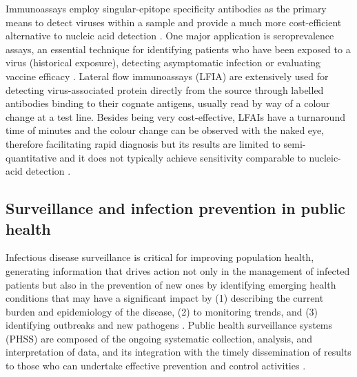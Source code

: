 Immunoassays employ singular-epitope specificity antibodies as the primary means to detect viruses within a sample and provide a much more cost-efficient alternative to nucleic acid detection \citep{cassedy_virus_2021}. 
One major application is seroprevalence assays, an essential technique for identifying patients who have been exposed to a virus (historical exposure), detecting asymptomatic infection or evaluating vaccine efficacy  \citep{chan_determining_2021, bobrovitz_global_2021}. 
Lateral flow immunoassays (LFIA) are extensively used for detecting virus-associated protein directly from the source through labelled antibodies binding to their cognate antigens, usually read by way of a colour change at a test line. 
Besides being very cost-effective, LFAIs have a turnaround time of minutes and the colour change can be observed with the naked eye, therefore facilitating rapid diagnosis but its results are limited to semi-quantitative and it does not typically achieve sensitivity comparable to nucleic-acid detection \citep{estrela_lateral_2016, cassedy_virus_2021, di_nardo_ten_2021}.

\subsection{Surveillance and infection prevention in public health} \label{ssec:survaillance}

Infectious disease surveillance is critical for improving population health, generating information that drives action not only in the management of infected patients but also in the prevention of new ones by identifying emerging health conditions that may have a significant impact by (1) describing the current burden and epidemiology of the disease, (2) to monitoring trends, and (3) identifying outbreaks and new pathogens \citep{groseclose_public_2017, murray_infectious_2017}. 
Public health surveillance systems (PHSS) are composed of the ongoing systematic collection, analysis, and interpretation of data, and its integration with the timely dissemination of results to those who can undertake effective prevention and control activities \citep{teutsch_considerations_2010}. 

